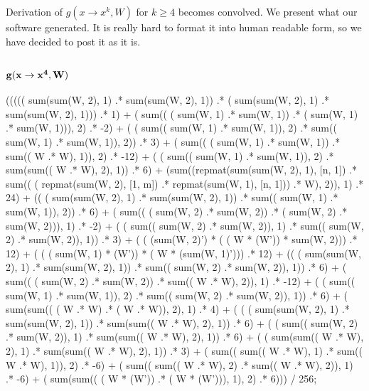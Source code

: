 \documentclass{article}
\begin{document}
 



Derivation of $g(x \rightarrow x^k, W)$ for $k \geq 4$ becomes
convolved. We present what our software generated.
It is really hard to format it into human readable form, so we have decided
to post it as it is.

\subsection{{$\bf g(x \rightarrow x^4, W)$}}
             ((((( sum(sum(W, 2), 1) .* sum(sum(W, 2), 1))  .* ( sum(sum(W, 2), 1) .* sum(sum(W, 2), 1)))  .* 1)  
              + ( sum(( ( sum(W, 1) .* sum(W, 1)) .* ( sum(W, 1) .* sum(W, 1))), 2) .* -2)  
              + ( ( sum(( sum(W, 1) .* sum(W, 1)), 2) .* sum(( sum(W, 1) .* sum(W, 1)), 2)) .* 3)  
              + ( sum(( ( sum(W, 1) .* sum(W, 1)) .* sum(( W .* W), 1)), 2) .* -12)  
              + ( ( sum(( sum(W, 1) .* sum(W, 1)), 2) .* sum(sum(( W .* W), 2), 1)) .* 6)  
              + (sum((repmat(sum(sum(W, 2), 1), [n, 1])  .* sum(( ( repmat(sum(W, 2), [1, m]) .* repmat(sum(W, 1), [n, 1])) .* W), 2)), 1)  .* 24)  
              + (( ( sum(sum(W, 2), 1) .* sum(sum(W, 2), 1)) .* sum(( sum(W, 1) .* sum(W, 1)), 2))  .* 6)  
              + ( sum(( ( sum(W, 2) .* sum(W, 2)) .* ( sum(W, 2) .* sum(W, 2))), 1) .* -2)  
              + ( ( sum(( sum(W, 2) .* sum(W, 2)), 1) .* sum(( sum(W, 2) .* sum(W, 2)), 1)) .* 3)  
              + ( ( (sum(W, 2)') * ( ( W * (W')) * sum(W, 2))) .* 12)  
              + ( ( ( sum(W, 1) * (W')) * ( W * (sum(W, 1)'))) .* 12)  
              + (( ( sum(sum(W, 2), 1) .* sum(sum(W, 2), 1)) .* sum(( sum(W, 2) .* sum(W, 2)), 1))  .* 6)  
              + ( sum(( ( sum(W, 2) .* sum(W, 2)) .* sum(( W .* W), 2)), 1) .* -12)  
              + ( ( sum(( sum(W, 1) .* sum(W, 1)), 2) .* sum(( sum(W, 2) .* sum(W, 2)), 1)) .* 6)  
              + ( sum(sum(( ( W .* W) .* ( W .* W)), 2), 1) .* 4)  
              + ( ( ( sum(sum(W, 2), 1) .* sum(sum(W, 2), 1)) .* sum(sum(( W .* W), 2), 1)) .* 6)  
              + ( ( sum(( sum(W, 2) .* sum(W, 2)), 1) .* sum(sum(( W .* W), 2), 1)) .* 6)  
              + ( ( sum(sum(( W .* W), 2), 1) .* sum(sum(( W .* W), 2), 1)) .* 3)  
              + ( sum(( sum(( W .* W), 1) .* sum(( W .* W), 1)), 2) .* -6)  
              + ( sum(( sum(( W .* W), 2) .* sum(( W .* W), 2)), 1) .* -6)   
              + ( sum(sum(( ( W * (W')) .* ( W * (W'))), 1), 2) .* 6))) / 256;
\end{document}
